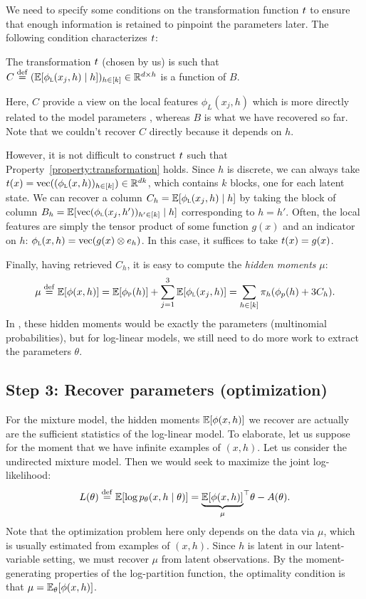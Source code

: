 We need to specify some conditions on the transformation function $t$
to ensure that enough information is retained to pinpoint the parameters later.
The following condition characterizes $t$:
\begin{property}
  \label{property:transformation}
  The transformation $t$ (chosen by us) is such that $C \stackrel{\rm def}{=}
  (\mathbb{E}[\phi_\text{\sc l}(x_j, h) \mid h])_{h \in [k]} \in \mathbb{R}^{d \times h}$ is a
  function of $B$.
\end{property}
Here, $C$ provide a view on the local features $\phi_L(x_j,h)$ which is more
directly related to the model parameters , whereas $B$ is
what we have recovered so far.  Note that we couldn't recover $C$ directly because it depends on $h$.

However, it is not difficult to construct $t$ such that Property~\ref{property:transformation} holds.
Since $h$ is discrete, we can always take $t(x) = \text{vec}((\phi_\text{\sc l}(x, h))_{h \in [k]}) \in \mathbb{R}^{dk}$,
which contains $k$ blocks, one for each latent state.  We can recover a column $C_h = \mathbb{E}[\phi_\text{\sc l}(x_j, h) \mid h]$
by taking the block of column $B_h = \mathbb{E}[\text{vec}(\phi_\text{\sc l}(x_j, h'))_{h' \in [k]} \mid h]$
corresponding to $h = h'$.
Often, the local features are simply the tensor product of some function $g(x)$ and an indicator on $h$:
$\phi_\text{\sc l}(x,h) = \text{vec}(g(x) \otimes e_h)$.
In this case, it suffices to take $t(x) = g(x)$.

Finally, having retrieved $C_h$, it is easy to compute the \emph{hidden moments} $\mu$:
\begin{align}
  \mu \stackrel{\rm def}{=} \mathbb{E}[\phi(x,h)] = \mathbb{E}[\phi_\text{\sc p}(h)] + \sum_{j=1}^3 \mathbb{E}[\phi_\text{\sc l}(x_j,h)] = \sum_{h \in [k]} \pi_h (\phi_p(h) + 3 C_h).
\end{align}
In \cite{anandkumar12moments}, these hidden moments would be exactly the parameters (multinomial probabilities), but
for log-linear models, we still need to do more work to extract the parameters $\theta$.

\subsection{Step 3: Recover parameters (optimization)}

For the mixture model, the hidden moments $\mathbb{E}[\phi(x,h)]$ we recover are actually
are the sufficient statistics of the log-linear model.
To elaborate, let us suppose for the moment that we have infinite examples of $(x,h)$.
Let us consider the undirected mixture model.
Then we would seek to maximize the joint log-likelihood:
\begin{align}
L(\theta) \stackrel{\rm def}{=} \mathbb{E}[\log p_\theta(x, h \mid \theta)] = {\underbrace{\mathbb{E}[\phi(x,h)]}_{\mu}}^\top\theta - A(\theta).
\end{align}
Note that the optimization problem here only depends on the data via $\mu$, which is usually estimated from examples of $(x,h)$.
Since $h$ is latent in our latent-variable setting, we must recover $\mu$ from latent observations.
By the moment-generating properties of the log-partition function,
the optimality condition is that $\mu = \mathbb{E}_\theta[\phi(x, h)]$.

